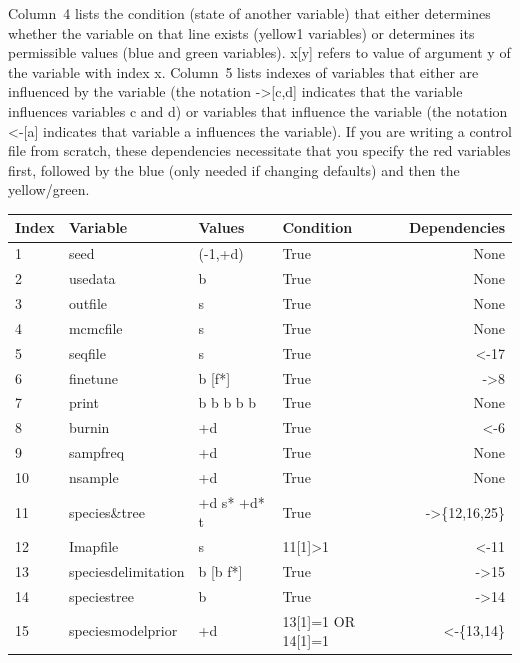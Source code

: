 \documentclass[a4paper]{book}
\numberwithin{equation}{section} \renewcommand{\baselinestretch}{0.55}
\begin{document}
Column~4 lists the condition (state of another variable) that either
determines whether the variable on that line exists (yellow1
variables) or determines its permissible values (blue and green
variables).  x[y] refers to value of argument y of the variable with
index x. Column~5 lists indexes of variables that either are
influenced by the variable (the notation ->[c,d] indicates that the
variable influences variables c and d) or variables that influence the
variable (the notation <-[a] indicates that variable a influences the
variable). If you are writing a control file from scratch, these
dependencies necessitate that you specify the red variables first,
followed by the blue (only needed if changing defaults) and then the
yellow/green.
\newpage
\begin{table}[h]
  \begin{center}
    {\small
    \begin{tabular}{@{}llllr@{}}
      \toprule
      Index & Variable & Values & Condition & Dependencies \\ \midrule
      1 & {\color{blue} seed} & (-1,+d) & True & None \\
      2 & {\color{blue} usedata} & b & True & None \\
      3 & {\color{red} outfile} & s & True& None \\
      4 & {\color{red} mcmcfile} & s & True & None \\
      5 & {\color{red} seqfile} & s & True & <-17 \\
      6 & {\color{red} finetune} & b [f*] & True & ->8 \\
      7 & {\color{red} print} & b b b b b & True & None \\
      8 & {\color{yellow1} burnin} & +d & True & <-6 \\
      9 & {\color{red} sampfreq} & +d & True & None \\
      10 & {\color{red} nsample} & +d & True & None \\
      11 & {\color{red} species\&tree} & +d s* +d* t & True & ->\{12,16,25\}  \\  
      12 & {\color{yellow1} Imapfile} & s & 11[1]>1 & <-11 \\
      13 & {\color{blue} speciesdelimitation} & b [b f*] & True & ->15 \\
      14 & {\color{blue} speciestree} & b & True & ->14 \\
      15 & {\color{yellow1} speciesmodelprior} & +d  & 13[1]=1 OR 14[1]=1 & <-\{13,14\} \\

\end{tabular}}
\end{center}
\end{table}
\end{document}
